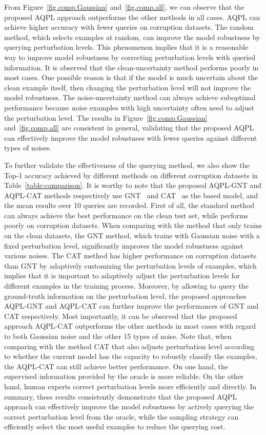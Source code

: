 \documentclass[letterpaper]{article} %
\begin{document}
From Figure~\ref{fig.comp.Gaussian} and~\ref{fig.comp.all}, we can observe that the proposed AQPL approach outperforms the other methods in all cases. AQPL can achieve higher accuracy with fewer queries on corruption datasets. The random method, which selects examples at random, can improve the model robustness by querying perturbation levels. This phenomenon implies that it is a reasonable way to improve model robustness by correcting perturbation levels with queried information. It is observed that the clean-uncertainty method performs poorly in most cases. One possible reason is that if the model is much uncertain about the clean example itself, then changing the perturbation level will not improve the model robustness. The noise-uncertainty method can always achieve suboptimal performance because noise examples with high uncertainty often need to adjust the perturbation level. The results in Figure~\ref{fig.comp.Gaussian} and~\ref{fig.comp.all} are consistent in general, validating that the proposed  AQPL can effectively improve the model robustness with fewer queries against different types of noises.

To further validate the effectiveness of the querying method, we also show the Top-1 accuracy achieved by different methods on different corruption datasets in Table~\ref{table:comparison}. It is worthy to note that the proposed AQPL-GNT and AQPL-CAT methods respectively use GNT~\cite{rusak2020increasing} and CAT~\cite{cheng2020cat} as the based model, and the mean results over 10 queries are recorded. First of all, the standard method can always achieve the best performance on the clean test set, while performs poorly on corruption datasets. When comparing with the method that only trains on the clean datasets, the GNT method, which trains with Gaussian noise with a fixed perturbation level, significantly improves the model robustness against various noises. The CAT method has higher performance on corruption datasets than GNT by adaptively customizing the perturbation levels of examples, which implies that it is important to adaptively adjust the perturbation levels for different examples in the training process. Moreover, by allowing to query the ground-truth information on the perturbation level, the proposed approaches AQPL-GNT and AQPL-CAT can further improve the performances of GNT and CAT respectively. Most importantly, it can be observed that the proposed approach AQPL-CAT outperforms the other methods in most cases with regard to both Gaussian noise and the other 15 types of noise. Note that, when comparing with the method CAT that also adjusts perturbation level according to whether the current model has the capacity to robustly classify the examples, the AQPL-CAT can still achieve better performance. On one hand, the supervised information provided by the oracle is more reliable. On the other hand, human experts correct perturbation levels more efficiently and directly.  In summary, these results consistently demonstrate that the proposed AQPL approach can effectively improve the model robustness by actively querying the correct perturbation level from the oracle, while the sampling strategy can efficiently select the most useful examples to reduce the querying cost.
\end{document}
